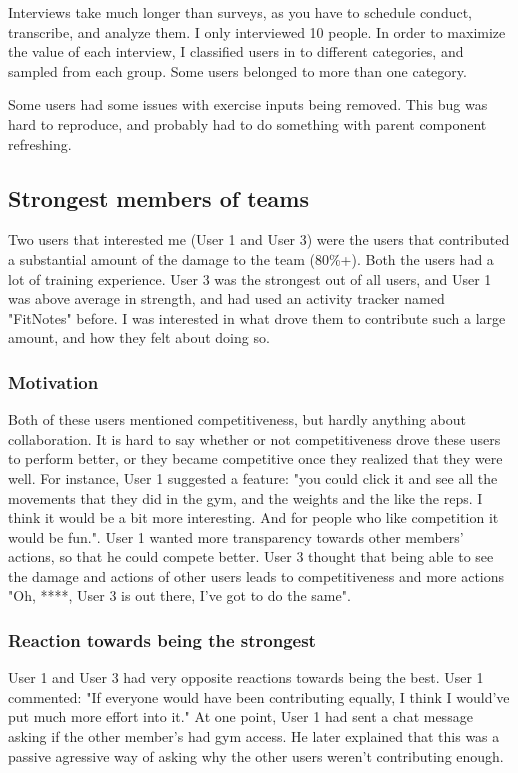 \documentclass{l4proj}
\begin{document}
Interviews take much longer than surveys, as you have to schedule conduct, transcribe, and analyze them. I only interviewed 10 people. In order to maximize the value of each interview, I classified users in to different categories, and sampled from each group. Some users belonged to more than one category. 

Some users had some issues with exercise inputs being removed. This bug was hard to reproduce, and probably had to do something with parent component refreshing. 

\subsection{Strongest members of teams}
Two users that interested me (User 1 and User 3) were the users that contributed a substantial amount of the damage to the team (80\%+). Both the users had a lot of training experience. User 3 was the strongest out of all users, and User 1 was above average in strength, and had used an activity tracker named "FitNotes" before. I was interested in what drove them to contribute such a large amount, and how they felt about doing so. 

\subsubsection{Motivation}
Both of these users mentioned competitiveness, but hardly anything about collaboration. It is hard to say whether or not competitiveness drove these users to perform better, or they became competitive once they realized that they were well. For instance, User 1 suggested a feature: "you could click it and see all the movements that they did in the gym, and the weights and the like the reps. I think it would be a bit more interesting. And for people who like competition it would be fun.". User 1 wanted more transparency towards other members' actions, so that he could compete better. User 3 thought that being able to see the damage and actions of other users leads to competitiveness and more actions "Oh, ****, User 3 is out there, I've got to do the same". 

\subsubsection{Reaction towards being the strongest}

User 1 and User 3 had very opposite reactions towards being the best. User 1 commented: "If everyone would have been contributing equally, I think I would've put much more effort into it." At one point, User 1 had sent a chat message asking if the other member's had gym access. He later explained that this was a passive agressive way of asking why the other users weren't contributing enough. 
\end{document}
